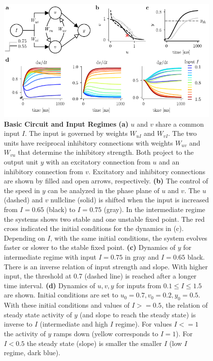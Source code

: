 \documentclass[10pt]{article}
\begin{document}
\begin{figure}[ht]
	\centering
	\includegraphics{figures/defCircuit_nullcl.pdf}
	\caption{\textbf{Basic Circuit and Input Regimes} 
	\textbf{(a)} $u$ and $v$ share a common input $I$. The input is governed by weights $W_{uI}$ and $W_{vI}$. The two units have reciprocal inhibitory connections with weights $W_{uv}$ and $W_{vu}$ that determine the inhibitory strength. Both project to the output unit $y$ with an excitatory connection from $u$ and an inhibitory connection from $v$. Excitatory and inhibitory connections are shown by filled and open arrows, respectively. 
	\textbf{(b)} The control of the speed in $y$ can be analyzed in the phase plane of $u$ and $v$. The $u$ (dashed) and $v$ nullcline (solid) is shifted when the input is increased from $I=0.65$ (black) to $I=0.75$ (gray). In the intermediate regime the systems shows two stable and one unstable fixed point. The red cross indicated the initial conditions for the dynamics in (c). Depending on $I$, with the same initial conditions, the system evolves faster or slower to the stable fixed point. 
	\textbf{(c)} Dynamics of $y$ for intermediate regime with input $I=0.75$ in gray and $I=0.65$ black. There is an inverse relation of input strength and slope. With higher input, the threshold at 0.7 (dashed line) is reached after a longer time interval. 
	\textbf{(d)} Dynamics of $u, v, y$ for inputs from $0.1\leq I \leq 1.5$ are shown. Initial conditions are set to $u_0=0.7 , v_0=0.2 , y_0=0.5$. With these initial conditions and values of $I>=0.5$, the relation of steady state activity of $y$ (and slope to reach the steady state) is inverse to $I$ (intermediate and high $I$ regime). For values $I<=1$ the activity of $y$ ramps down (yellow corresponds to $I=1$). For $I<0.5$ the steady state (slope) is smaller the smaller $I$ (low $I$ regime, dark blue).}
\label{fig:circuit}
\end{figure}
\end{document}
